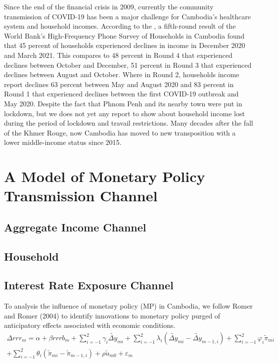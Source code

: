 \documentclass[11pt,letterpaper]{article}
\begin{document}
Since the end of the financial crisis in 2009, currently the community transmission of COVID-19 has been a major challenge for Cambodia's healthcare system and household incomes. According to the \cite{Karamba2021}, a fifth-round result of the World Bank's High-Frequency Phone Survey of Households in Cambodia found that 45 percent of households experienced declines in income in December 2020 and March 2021. This compares to 48 percent in Round 4 that experienced declines between October and December, 51 percent in Round 3 that experienced declines between August and October. Where in Round 2, households income report declines 63 percent between May and August 2020 and 83 percent in Round 1 that experienced declines between the first COVID-19 outbreak and May 2020. Despite the fact that Phnom Penh and its nearby town were put in lockdown, but we does not yet any report to show about household income lost during the period of lockdown and travail restrictions.  
Many decades after the fall of the Khmer Rouge, now Cambodia has moved to new transposition with a lower middle-income status since 2015. 
\section{A Model of Monetary Policy Transmission Channel}\label{sec:model}

\subsection{Aggregate Income Channel}

\subsection{Household}

\subsection{Interest Rate Exposure Channel}
To analysis the influence  of monetary policy (MP) in Cambodia, we follow Romer and Romer (2004) to identify innovations to monetary policy purged of anticipatory effects associated with economic conditions. 
\begin{equation}\begin{split}
\Delta rrr_{m} = \alpha + \beta rrrb_{m} + \sum_{i = -1}^{2}{\gamma_{i} \widetilde{\Delta y}_{mi}} + \sum_{i = -1}^{2} \lambda_{i} (\widetilde{\Delta y}_{mi} - \widetilde{\Delta y}_{m-1, i}) + \sum_{i = -1}^{2} \varphi_{i}\widetilde{\pi}_{mi} \\
+ \sum_{i = -1}^{2}\theta_{i}(\widetilde\pi_{mi} - \widetilde\pi_{m-1, i}) + \rho \widetilde{u}_{m0} + \varepsilon_{m}
\end{split}\end{equation}
\end{document}
